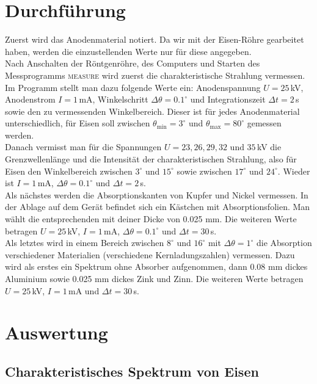 \documentclass[12pt,a4paper,titlepage,headinclude,bibtotoc]{scrartcl}
\begin{document}
\section{Durchführung}
\label{sec:durchfuehrung}
Zuerst wird das Anodenmaterial notiert.
Da wir mit der Eisen-Röhre gearbeitet haben, werden die einzustellenden Werte nur für diese angegeben.\\
Nach Anschalten der Röntgenröhre, des Computers und Starten des Messprogramms \textsc{measure} wird zuerst die charakteristische Strahlung vermessen.
Im Programm stellt man dazu folgende Werte ein: Anodenspannung $U=25\,$kV, Anodenstrom $I=1\,$mA, Winkelschritt $\Delta\theta=0.1^\circ$ und Integrationszeit $\Delta t=2\,$s sowie den zu vermessenden Winkelbereich.
Dieser ist für jedes Anodenmaterial unterschiedlich, für Eisen soll zwischen $\theta_\text{min}=3^\circ$ und $\theta_\text{max}=80^\circ$ gemessen werden.\\
Danach vermisst man für die Spannungen $U=23, 26, 29, 32 \text{ und } 35\,$kV die Grenzwellenlänge und die Intensität der charakteristischen Strahlung, also für Eisen den Winkelbereich zwischen $3^\circ$ und $15^\circ$ sowie zwischen $17^\circ$ und $24^\circ$.
Wieder ist $I=1\,$mA, $\Delta\theta=0.1^\circ$ und $\Delta t=2\,$s.\\
Als nächstes werden die Absorptionskanten von Kupfer und Nickel vermessen.
In der Ablage auf dem Gerät befindet sich ein Kästchen mit Absorptionsfolien.
Man wählt die entsprechenden mit deiner Dicke von 0.025 mm.
Die weiteren Werte betragen $U=25\,$kV, $I=1\,$mA, $\Delta\theta=0.1^\circ$ und $\Delta t=30\,$s.\\
Als letztes wird in einem Bereich zwischen $8^\circ$ und $16^\circ$ mit $\Delta\theta=1^\circ$ die Absorption verschiedener Materialien (verschiedene Kernladungszahlen) vermessen.
Dazu wird als erstes ein Spektrum ohne Absorber aufgenommen, dann 0.08 mm dickes Aluminium sowie 0.025 mm dickes Zink und Zinn.
Die weiteren Werte betragen $U=25\,$kV, $I=1\,$mA und $\Delta t=30\,$s.

\section{Auswertung}
\label{sec:auswertung}
\subsection{Charakteristisches Spektrum von Eisen}
\end{document}
